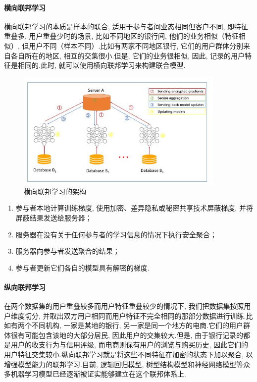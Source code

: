 \documentclass[a4paper]{article}
\begin{document}
\paragraph{横向联邦学习}  横向联邦学习的本质是样本的联合, 适用于参与者间业态相同但客户不同, 即特征重叠多, 用户重叠少时的场景, 比如不同地区的银行间, 他们的业务相似（特征相似）, 但用户不同（样本不同）.比如有两家不同地区银行, 它们的用户群体分别来自各自所在的地区, 相互的交集很小.但是, 它们的业务很相似, 因此, 记录的用户特征是相同的.此时,  就可以使用横向联邦学习来构建联合模型. 
 
\begin{figure}
    \centering
    \label{Architecture for horizontal FL}
    \includegraphics[width=0.9\textwidth]{Architecture_for_horizontal_FL_system.jpg}
    \caption{横向联邦学习的架构}
\end{figure}

\begin{enumerate}
\item 参与者本地计算训练梯度, 使用加密\citep{aono2017privacy}、差异隐私\citep{shokri2015privacy}或秘密共享技术屏蔽梯度\citep{bonawitz2017practical}, 并将屏蔽结果发送给服务器；
\item 服务器在没有关于任何参与者的学习信息的情况下执行安全聚合；
\item 服务器向参与者发送聚合的结果；
\item 参与者更新它们各自的模型具有解密的梯度.
\end{enumerate}

\paragraph{纵向联邦学习}
在两个数据集的用户重叠较多而用户特征重叠较少的情况下, 我们把数据集按照用户维度切分, 并取出双方用户相同而用户特征不完全相同的那部分数据进行训练.比如有两个不同机构, 一家是某地的银行, 另一家是同一个地方的电商.它们的用户群体很有可能包含该地的大部分居民, 因此用户的交集较大.但是, 由于银行记录的都是用户的收支行为与信用评级, 而电商则保有用户的浏览与购买历史, 因此它们的用户特征交集较小.纵向联邦学习就是将这些不同特征在加密的状态下加以聚合, 以增强模型能力的联邦学习.目前, 逻辑回归模型, 树型结构模型和神经网络模型等众多机器学习模型已经逐渐被证实能够建立在这个联邦体系上.
\end{document}
